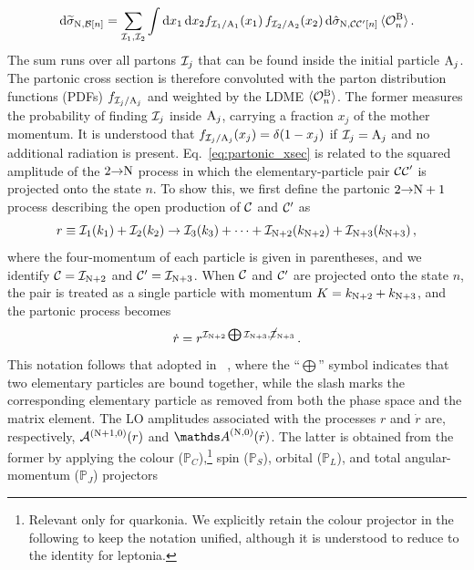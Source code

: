 \begin{equation}
    \mathrm{d} \widetilde \sigma_{{\rm N},{\cal B}[n]} = \sum_{{\cal I}_1, {\cal I}_2}\int \mathrm{d} x_1\, \mathrm{d} x_2 f_{{\cal I}_1/\mathrm{A}_1}(x_1)\, f_{{\cal I}_2/\mathrm{A}_2}(x_2)\, \mathrm{d}\hat\sigma_{{\rm N},{{\cal CC}^\prime}[n]}\, \langle \mathcal O_{n}^{\rm B} \rangle \,.
\label{eq:from_part-xsec_to_mg5-xsec}
\end{equation}
The sum runs over all partons ${\cal I}_j$ that can be found inside the initial particle ${\rm A}_j$. The partonic cross section is therefore convoluted with the parton distribution functions (PDFs) $f_{{\cal I}_j/\mathrm{A}_j}$ and weighted by the LDME $\langle \mathcal O_{n}^{\rm B}\rangle$.
The former measures the probability of finding ${\cal I}_j$ inside ${\rm A}_j$, carrying a fraction $x_j$ of the mother momentum. It is understood that $f_{{\cal I}_j/\mathrm{A}_j}(x_j) = \delta(1 - x_j)$ if ${\cal I}_j = {\rm A}_j$ and no additional radiation is present. Eq.~\eqref{eq:partonic_xsec} is related to the squared amplitude of the $2{\to}{\rm N}$ process in which the elementary-particle pair ${\cal C C}^\prime$ is projected onto the state $n$. To show this, we first define the partonic $2{\to}{\rm N}+1$ process describing the open production of ${\cal C}$ and ${\cal C}^\prime$ as
\begin{equation}
    r \equiv {\cal I}_1 (k_1)+{\cal I}_2(k_2) \to {\cal I}_3(k_3) + \dots + {\cal I}_{{\rm N}+2}(k_{{\rm N}+2}) + {\cal I}_{{\rm N}+3}(k_{{\rm N}+3})\,,
\end{equation}
where the four-momentum of each particle is given in parentheses, and we identify ${\cal C} = {\cal I}_{{\rm N}+2}$ and ${\cal C}^\prime = {\cal I}_{{\rm N}+3}$. When ${\cal C}$ and ${\cal C}^\prime$ are projected onto the state $n$, the pair is treated as a single particle with momentum $K = k_{{\rm N}+2} + k_{{\rm N}+3}$, and the partonic process becomes
\begin{equation}
    \dot r = r^{{\cal I}_{{\rm N}+2} \bigoplus {\cal I}_{{\rm N}+3},\cancel{{\cal I}}_{{\rm N}+3}}\,.
\label{eq:mg5_process_definition}
\end{equation}
This notation follows that adopted in \mgshort~\cite{Frederix:2009yq}, where the “$\bigoplus$” symbol indicates that two elementary particles are bound together, while the slash marks the corresponding elementary particle as removed from both the phase space and the matrix element. The LO amplitudes associated with the processes $r$ and $\dot r$ are, respectively, ${\cal A}^{({\rm N}+1,0)}(r)$ and ${\mathds A}^{({\rm N},0)}(\dot{r})$. The latter is obtained from the former by applying the colour (${\mathds P}_C$),\footnote{Relevant only for quarkonia. We explicitly retain the colour projector in the following to keep the notation unified, although it is understood to reduce to the identity for leptonia.} spin (${\mathds P}_S$), orbital (${\mathds P}_L$), and total angular-momentum (${\mathds P}_J$) projectors

